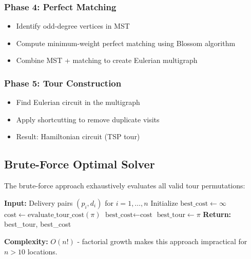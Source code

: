 \documentclass[9pt,a4paper,twoside]{tau}
\begin{document}
\subsubsection{Phase 4: Perfect Matching}
\begin{itemize}
    \item Identify odd-degree vertices in MST
    \item Compute minimum-weight perfect matching using Blossom algorithm
    \item Combine MST + matching to create Eulerian multigraph
\end{itemize}

\subsubsection{Phase 5: Tour Construction}
\begin{itemize}
    \item Find Eulerian circuit in the multigraph
    \item Apply shortcutting to remove duplicate visits
    \item Result: Hamiltonian circuit (TSP tour)
\end{itemize}

\subsection{Brute-Force Optimal Solver}

The brute-force approach exhaustively evaluates all valid tour permutations:

\begin{algorithmic}[1]
\STATE \textbf{Input:} Delivery pairs $(p_i, d_i)$ for $i = 1, \ldots, n$
\STATE Initialize $\text{best\_cost} \leftarrow \infty$
        \STATE $\text{cost} \leftarrow \text{evaluate\_tour\_cost}(\pi)$
            \STATE $\text{best\_cost} \leftarrow \text{cost}$
            \STATE $\text{best\_tour} \leftarrow \pi$
        \ENDIF
    \ENDIF
\ENDFOR
\STATE \textbf{Return:} best\_tour, best\_cost
\end{algorithmic}

\textbf{Complexity:} $O(n!)$ - factorial growth makes this approach impractical for $n > 10$ locations.

\end{document}
